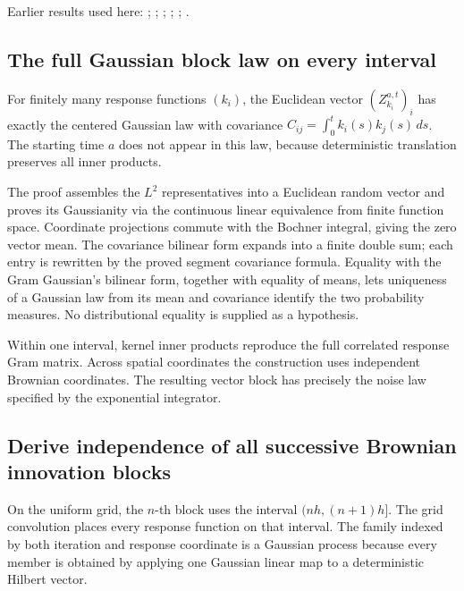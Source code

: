 \documentclass[11pt,a4paper]{report}
\begin{document}
Earlier results used here: \cite[Section~3.6.12]{LangevinLean2026ULASC}; \cite[Section~3.6.17]{LangevinLean2026ULASC}; \cite[Section~3.6.25]{LangevinLean2026ULASC}; \cite[Section~3.6.26]{LangevinLean2026ULASC}; \cite[Section~3.7.1]{LangevinLean2026ULASC}; \cite[Section~3.8.5]{LangevinLean2026ULASC}.
\subsection{\texorpdfstring{The full Gaussian block law on every interval}{The full Gaussian block law on every interval}}
\label{report-step-KineticLangevin-BrownianSegments-lean-4}


For finitely many response functions \((k_i)\), the Euclidean vector \((Z_{k_i}^{a,t})_i\) has exactly the centered Gaussian law with covariance \(C_{ij}=\int_0^t k_i(s)k_j(s)\,ds\). The starting time \(a\) does not appear in this law, because deterministic translation preserves all inner products.



The proof assembles the \(L^{2}\) representatives into a Euclidean random vector and proves its Gaussianity via the continuous linear equivalence from finite function space. Coordinate projections commute with the Bochner integral, giving the zero vector mean. The covariance bilinear form expands into a finite double sum; each entry is rewritten by the proved segment covariance formula. Equality with the Gram Gaussian's bilinear form, together with equality of means, lets uniqueness of a Gaussian law from its mean and covariance identify the two probability measures. No distributional equality is supplied as a hypothesis.



Within one interval, kernel inner products reproduce the full correlated response Gram matrix. Across spatial coordinates the construction uses independent Brownian coordinates. The resulting vector block has precisely the noise law specified by the exponential integrator.

\subsection{\texorpdfstring{Derive independence of all successive Brownian innovation blocks}{Derive independence of all successive Brownian innovation blocks}}
\label{report-step-KineticLangevin-BrownianSegments-lean-5}


On the uniform grid, the \(n\)-th block uses the interval \((nh,(n+1)h]\). The grid convolution places every response function on that interval. The family indexed by both iteration and response coordinate is a Gaussian process because every member is obtained by applying one Gaussian linear map to a deterministic Hilbert vector.
\end{document}
